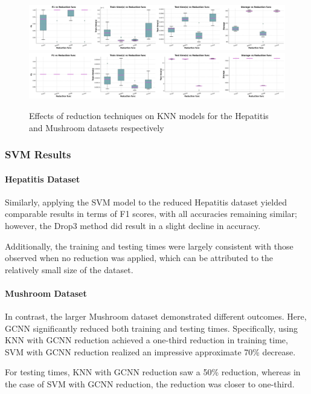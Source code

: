 \begin{figure}
    \centering
    \includegraphics[width=\textwidth]{figures/KNN_reduction_effects_hepatitis.png}
    \includegraphics[width=\textwidth]{figures/KNN_reduction_effects_mushroom.png}
    \caption{Effects of reduction techniques on KNN models for the Hepatitis and Mushroom datasets respectively}
    \label{fig:KNN-reduction-effects}
\end{figure}

\subsubsection{SVM Results}

\paragraph{Hepatitis Dataset} Similarly, applying the SVM model to the reduced Hepatitis dataset yielded comparable results in terms of F1 scores,
with all accuracies remaining similar; however, the Drop3 method did result in a slight decline in accuracy.

Additionally, the training and testing times were largely consistent with those observed when no reduction was applied,
which can be attributed to the relatively small size of the dataset.

\paragraph{Mushroom Dataset} In contrast, the larger Mushroom dataset demonstrated different outcomes.
Here, GCNN significantly reduced both training and testing times. 
Specifically, using KNN with GCNN reduction achieved a one-third reduction in training time,\\
SVM with GCNN reduction realized an impressive approximate 70\% decrease. 

For testing times, KNN with GCNN reduction saw a 50\% reduction, whereas in the case of SVM with GCNN reduction, the reduction was closer to one-third.

